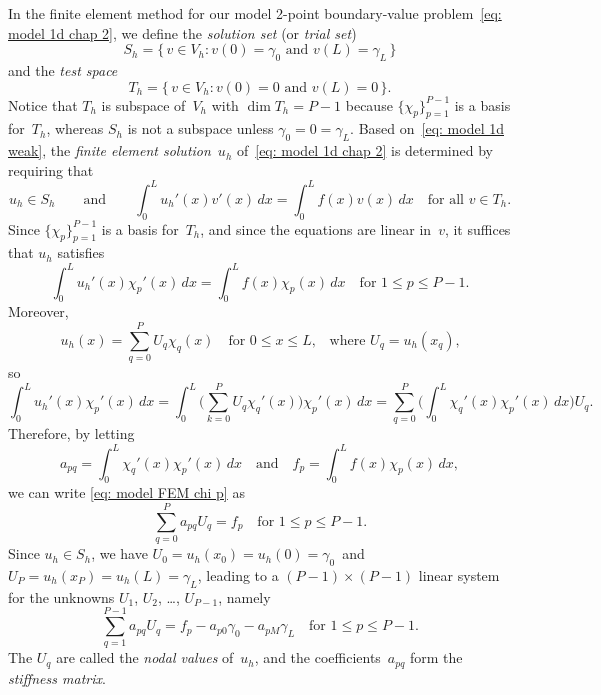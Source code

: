 In the finite element method for our model 2-point boundary-value 
problem~\eqref{eq: model 1d chap 2}, we define the \emph{solution set} (or
\emph{trial set})
\begin{equation}\label{eq: Sh 1D}
S_h=\{\,v\in V_h:\text{$v(0)=\gamma_0$ and $v(L)=\gamma_L$}\,\}
\end{equation}
and the \emph{test space}
\[
T_h=\{\,v\in V_h:\text{$v(0)=0$ and $v(L)=0$}\,\}.
\]
Notice that $T_h$ is subspace of~$V_h$ with $\dim T_h=P-1$ because 
$\{\chi_p\}_{p=1}^{P-1}$ is a basis for~$T_h$, whereas $S_h$ is 
not a subspace unless $\gamma_0=0=\gamma_L$.  Based 
on~\eqref{eq: model 1d weak}, the \emph{finite element solution}~$u_h$
of~\eqref{eq: model 1d chap 2} is determined by requiring that
\[
u_h\in S_h\qquad\text{and}\qquad
\int_0^L u_h'(x)v'(x)\,dx=\int_0^L f(x)v(x)\,dx \quad\text{for all $v\in T_h$.}
\]
Since $\{\chi_p\}_{p=1}^{P-1}$ is a basis for~$T_h$, and since the equations 
are linear in~$v$, it suffices that $u_h$ satisfies
\begin{equation}\label{eq: model FEM chi p}
\int_0^L u_h'(x)\chi_p'(x)\,dx=\int_0^L f(x)\chi_p(x)\,dx 
    \quad\text{for $1\le p\le P-1$.}
\end{equation}
Moreover, 
\begin{equation}\label{eq: uh U 1d}
u_h(x)=\sum_{q=0}^P U_q\chi_q(x)\quad\text{for $0\le x\le L$,}\quad
\text{where $U_q=u_h(x_q)$,}
\end{equation}
so
\[
\int_0^Lu_h'(x)\chi_p'(x)\,dx
    =\int_0^L\biggl(\sum_{k=0}^PU_q\chi_q'(x)\biggr)\chi_p'(x)\,dx
    =\sum_{q=0}^P\biggl(\int_0^L\chi_q'(x)\chi_p'(x)\,dx\biggr)U_q.
\]
Therefore, by letting
\[
a_{pq}=\int_0^L\chi_q'(x)\chi_p'(x)\,dx
\quad\text{and}\quad
f_p=\int_0^Lf(x)\chi_p(x)\,dx,
\]
we can write \eqref{eq: model FEM chi p} as
\[
\sum_{q=0}^P a_{pq}U_q=f_p\quad\text{for $1\le p\le P-1$.}
\]
Since $u_h\in S_h$, we have $U_0=u_h(x_0)=u_h(0)=\gamma_0$~and 
$U_P=u_h(x_P)=u_h(L)=\gamma_L$, leading to a $(P-1)\times(P-1)$ linear system 
for the unknowns $U_1$, $U_2$, \dots, $U_{P-1}$, namely
\begin{equation}\label{eq: model FEM eqns}
\sum_{q=1}^{P-1}a_{pq}U_q=f_p-a_{p0}\gamma_0-a_{pM}\gamma_L
    \quad\text{for $1\le p\le P-1$.}
\end{equation}
The $U_q$ are called the \emph{nodal values} of~$u_h$, and the 
coefficients~$a_{pq}$ form the \emph{stiffness matrix}.

